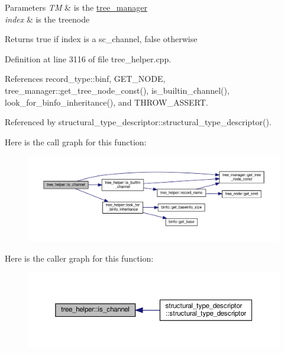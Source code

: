 \begin{DoxyParams}{Parameters}
{\em TM} & is the \hyperlink{classtree__manager}{tree\+\_\+manager} \\
\hline
{\em index} & is the treenode \\
\hline
\end{DoxyParams}
\begin{DoxyReturn}{Returns}
true if index is a sc\+\_\+channel, false otherwise 
\end{DoxyReturn}


Definition at line 3116 of file tree\+\_\+helper.\+cpp.



References record\+\_\+type\+::binf, G\+E\+T\+\_\+\+N\+O\+DE, tree\+\_\+manager\+::get\+\_\+tree\+\_\+node\+\_\+const(), is\+\_\+builtin\+\_\+channel(), look\+\_\+for\+\_\+binfo\+\_\+inheritance(), and T\+H\+R\+O\+W\+\_\+\+A\+S\+S\+E\+RT.



Referenced by structural\+\_\+type\+\_\+descriptor\+::structural\+\_\+type\+\_\+descriptor().

Here is the call graph for this function\+:
\nopagebreak
\begin{figure}[H]
\begin{center}
\leavevmode
\includegraphics[width=350pt]{d7/d99/classtree__helper_af7d6783fd734a05edd5728b2a8e98b77_cgraph}
\end{center}
\end{figure}
Here is the caller graph for this function\+:
\nopagebreak
\begin{figure}[H]
\begin{center}
\leavevmode
\includegraphics[width=350pt]{d7/d99/classtree__helper_af7d6783fd734a05edd5728b2a8e98b77_icgraph}
\end{center}
\end{figure}
\mbox{\label{classtree__helper_aa499e91ca23843d84379d18832867ea6}} 
